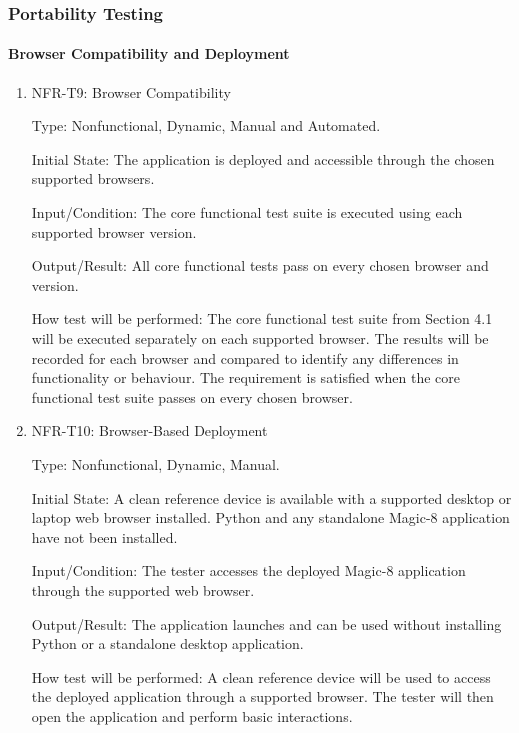 \documentclass[12pt, titlepage]{article}
\begin{document}
\subsubsection{Portability Testing}

\paragraph{Browser Compatibility and Deployment}

\begin{enumerate}

\item{NFR-T9: Browser Compatibility\\}

Type: Nonfunctional, Dynamic, Manual and Automated.

Initial State: The application is deployed and accessible through
the chosen supported browsers.

Input/Condition: The core functional test suite is executed using
each supported browser version.

Output/Result: All core functional tests pass on every chosen browser and version.

How test will be performed: The core functional test suite from
Section 4.1 will be executed separately on each supported browser.
The results will be recorded for each browser and compared to identify
any differences in functionality or behaviour. The requirement is
satisfied when the core functional test suite passes on every chosen browser.

\item{NFR-T10: Browser-Based Deployment\\}

Type: Nonfunctional, Dynamic, Manual.

Initial State: A clean reference device is available with a supported
desktop or laptop web browser installed. Python and any standalone
Magic-8 application have not been installed.

Input/Condition: The tester accesses the deployed Magic-8 application
through the supported web browser.

Output/Result: The application launches and can be used without
installing Python or a standalone desktop application.

How test will be performed: A clean reference device will be used
to access the deployed application through a supported browser.
The tester will then open the application and perform basic interactions.

\end{enumerate}
\end{document}
